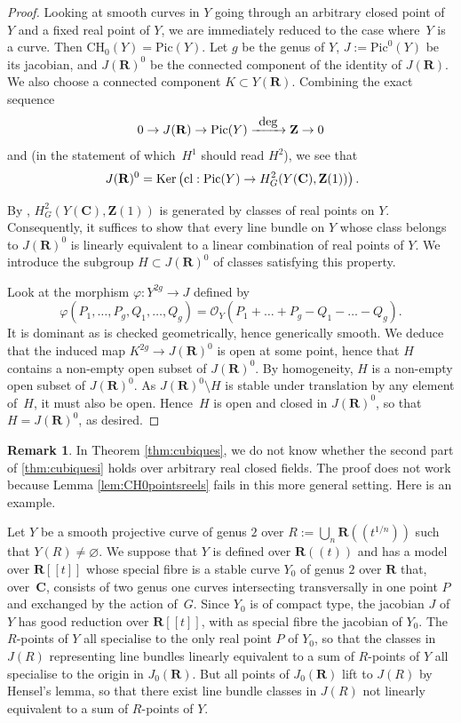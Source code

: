 \documentclass[JEP,XML,SOM,Unicode]{cedram}
\newcommand{\To}[1]{\mathchoice{\xrightarrow{\textstyle\kern4pt#1\kern3pt}}{\stackrel{#1}{\longrightarrow}}{}{}}
\newcommand{\lpr}{(\!(}
\newcommand{\rpr}{)\!)}
\newcommand{\lcr}{[\![}
\newcommand{\rcr}{]\!]}
\theoremstyle{plain}
\theoremstyle{definition}
\newtheorem{rmk}[thm]{Remark}
\numberwithin{equation}{section}
\newcommand{\cl}{{\mathrm{cl}}}
\newcommand{\sO}{{\mathscr O}}
\renewcommand{\C}{{\mathbf C}}
\newcommand{\R}{{\mathbf R}}
\newcommand{\Z}{{\mathbf Z}}
\newcommand{\CH}{\mathrm{CH}}
\newcommand{\Pic}{\mathrm{Pic}}
\renewcommand{\phi}{\varphi}
\renewcommand{\emptyset}{\varnothing}
\newcommand{\Ker}{{\mathrm{Ker}}}
\begin{document}
\begin{proof}
Looking at smooth curves in $Y$ going through an arbitrary closed point of~$Y$ and a fixed real point of $Y$, we are immediately reduced to the case where~$Y$ is a curve. Then $\CH_0(Y)=\Pic(Y)$. Let $g$ be the genus of
$Y$, $J:=\Pic^0(Y)$ be its jacobian, and $J(\R)^0$ be the connected component of the identity of $J(\R)$. We also choose a connected component $K\subset Y(\R)$.
Combining the exact sequence
\[
0\to J(\R)\to \Pic(Y)\To{\deg} \Z\to 0
\]
and \cite[Ch.\,IV, Cor.\,4.2]{vanhamelthese} (in the statement of which~$H^1$ should read $H^2$), we see that
\[
J(\R)^0=\Ker\left(\cl:\Pic(Y)\to H^2_G(Y(\C),\Z(1))\right)\rlap{.}
\]

By \cite[Lem.\,\ref*{BW1-lem:H2dreel}]{BW1}, $H^2_G(Y(\C),\Z(1))$ is generated by classes of real points on $Y$. Consequently, it suffices to show that every line bundle on $Y$ whose class belongs to $J(\R)^0$ is linearly equivalent to a linear combination of real points of $Y$. We introduce the subgroup $H\subset J(\R)^0$ of classes satisfying this property.

Look at the morphism $\phi:Y^{2g}\to J$ defined by
\[
\phi(P_1,\dots,P_g,Q_1,\dots,Q_g)=\sO_Y(P_1+\dots +P_g-Q_1-\dots-Q_g).
\]
It is dominant as is checked geometrically, hence generically smooth. We deduce that the induced map $K^{2g}\to J(\R)^0$ is open at some point, hence that $H$ contains a non-empty open subset of $ J(\R)^0$. By homogeneity, $H$ is a non-empty open subset of $J(\R)^0$.
As $J(\R)^0\setminus H$ is stable under translation by any element of~$H$,
it must also be open. Hence~$H$ is open and closed in $J(\R)^0$, so that $H=J(\R)^0$, as desired.
\end{proof}

\begin{rmk}
In Theorem \ref{thm:cubiques}, we do not know whether the second part of \eqref{thm:cubiquesi} holds over arbitrary real closed fields. The proof does not work because Lemma \ref{lem:CH0pointsreels} fails in this more general setting. Here is an example.

Let $Y$ be a smooth projective curve of genus $2$ over $R:=\bigcup_n\R\lpr t^{1/n}\rpr$ such that $Y(R)\neq\emptyset$. We suppose that $Y$ is defined over $\R\lpr t\rpr$ and has a model over $\R\lcr t\rcr$ whose special fibre is a stable curve $Y_0$ of genus $2$ over $\R$ that, over~$\C$, consists of two genus one curves intersecting transversally in one point $P$ and exchanged by the action of~$G$.
Since $Y_0$ is of compact type, the jacobian $J$ of $Y$ has good reduction over $\R\lcr t\rcr$, with as special fibre the jacobian of $Y_0$. The $R$-points of $Y$ all specialise to the only real point $P$ of $Y_0$, so that the classes in $J(R)$ representing line bundles linearly equivalent to a sum of $R$-points of $Y$ all specialise to the origin in $J_0(\R)$. But all points of $J_0(\R)$ lift to $J(R)$ by Hensel's lemma, so that there exist line bundle classes in $J(R)$ not linearly equivalent to a sum of $R$-points of $Y$.
\end{rmk}

\backmatter


\end{document}
